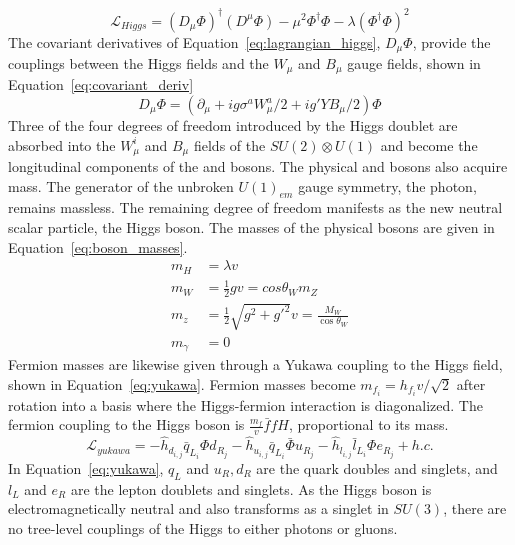 \begin{equation}
    \mathcal{L}_{Higgs} = (D_\mu\Phi)^\dagger(D^\mu\Phi) - \mu^2 \Phi^\dagger\Phi - \lambda(\Phi^\dagger\Phi)^2
    \label{eq:lagrangian_higgs}
\end{equation}
The covariant derivatives of Equation~\ref{eq:lagrangian_higgs}, $D_\mu\Phi$, provide the couplings between the Higgs fields and the $W_\mu$ and $B_\mu$ gauge fields, shown in Equation~\ref{eq:covariant_deriv}
\begin{equation}
    D_\mu \Phi = (\partial_\mu + ig\sigma^aW_\mu^a/2 + ig'YB_\mu/2)\Phi
    \label{eq:covariant_deriv}
\end{equation}
Three of the four degrees of freedom introduced by the Higgs doublet are absorbed into the $W^i_\mu$ and $B_\mu$ fields of the $SU(2)\otimes U(1)$ and become the longitudinal components of the \W and \Z bosons. The physical \W and \Z bosons also acquire mass. The generator of the unbroken $U(1)_{em}$ gauge symmetry, the photon, remains massless. The remaining degree of freedom manifests as the new neutral scalar particle, the Higgs boson. The masses of the physical bosons are given in Equation~\ref{eq:boson_masses}.
\begin{equation}
\begin{aligned}
m_H &= \lambda v \\ 
m_W &= \frac{1}{2}g v = cos\theta_W m_Z \\ 
m_z &= \frac{1}{2}\sqrt{g^2+g'^2}v  = \frac{M_W}{\cos{\theta_W}}\\ 
m_\gamma &= 0
\end{aligned}
\label{eq:boson_masses}
\end{equation}
Fermion masses are likewise given through a Yukawa coupling to the Higgs field, shown in Equation~\ref{eq:yukawa}. Fermion masses become $m_{f_i} = h_{f_i} v / \sqrt{2}$ after rotation into a basis where the Higgs-fermion interaction is diagonalized. The fermion coupling to the Higgs boson is $\frac{m_f}{v}\bar{f}fH$, proportional to its mass.
\begin{equation}
\mathcal{L}_{yukawa} = -\hat{h}_{d_{i,j}}\bar{q}_{L_i}\Phi d_{R_j} - \hat{h}_{u_{i,j}}\bar{q}_{L_i}\bar{\Phi} u_{R_j} -\hat{h}_{l_{i,j}}\bar{l}_{L_i}\Phi e_{R_j} + h.c.
    \label{eq:yukawa}
\end{equation}
In Equation~\ref{eq:yukawa}, $q_L$ and $u_R,d_R$ are the quark doubles and singlets, and $l_L$ and $e_R$ are the lepton doublets and singlets. As the Higgs boson is electromagnetically neutral and also transforms as a singlet in $SU(3)$, there are no tree-level couplings of the Higgs to either photons or gluons.

